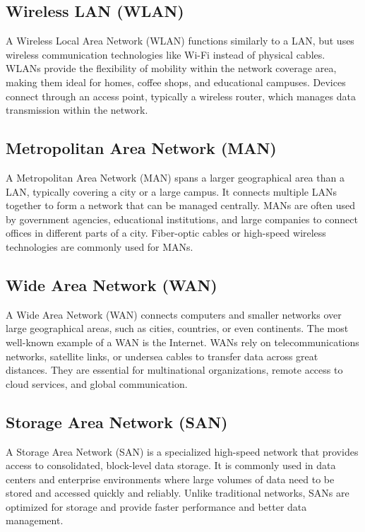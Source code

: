 \subsection{Wireless LAN (WLAN)}
A Wireless Local Area Network (WLAN) functions similarly to a LAN, but uses wireless communication technologies like Wi-Fi instead of physical cables. WLANs provide the flexibility of mobility within the network coverage area, making them ideal for homes, coffee shops, and educational campuses. Devices connect through an access point, typically a wireless router, which manages data transmission within the network.

\subsection{Metropolitan Area Network (MAN)}
A Metropolitan Area Network (MAN) spans a larger geographical area than a LAN, typically covering a city or a large campus. It connects multiple LANs together to form a network that can be managed centrally. MANs are often used by government agencies, educational institutions, and large companies to connect offices in different parts of a city. Fiber-optic cables or high-speed wireless technologies are commonly used for MANs.

\subsection{Wide Area Network (WAN)}
A Wide Area Network (WAN) connects computers and smaller networks over large geographical areas, such as cities, countries, or even continents. The most well-known example of a WAN is the Internet. WANs rely on telecommunications networks, satellite links, or undersea cables to transfer data across great distances. They are essential for multinational organizations, remote access to cloud services, and global communication.

\subsection{Storage Area Network (SAN)}
A Storage Area Network (SAN) is a specialized high-speed network that provides access to consolidated, block-level data storage. It is commonly used in data centers and enterprise environments where large volumes of data need to be stored and accessed quickly and reliably. Unlike traditional networks, SANs are optimized for storage and provide faster performance and better data management.

